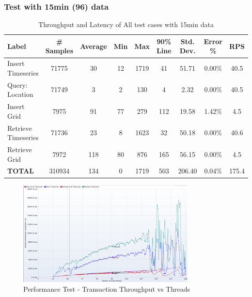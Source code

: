\subsubsection{Test with 15min (96) data}
\begin{table}[]
\begin{tabulary}{\linewidth}{|L|C|C|C|C|C|C|C|C|}
\hline
Label & \# Samples & Average & Min & Max & 90\% Line & Std. Dev. & Error \% & RPS \\ \hline
Insert Timeseries & 71775 & 30 & 12 & 1719 & 41 & 51.71 & 0.00\% & 40.5 \\ \hline
Query: Location & 71749 & 3 & 2 & 130 & 4 & 2.32 & 0.00\% & 40.5 \\ \hline
Insert Grid & 7975 & 91 & 77 & 279 & 112 & 19.58 & 1.42\% & 4.5 \\ \hline
Retrieve Timeseries & 71736 & 23 & 8 & 1623 & 32 & 50.18 & 0.00\% & 40.6 \\ \hline
Retrieve Grid & 7972 & 118 & 80 & 876 & 165 & 56.15 & 0.00\% & 4.5 \\ \hline
\textbf{TOTAL} & 310934 & 134 & 0 & 1719 & 503 & 206.40 & 0.04\% & 175.4 \\ \hline
\end{tabulary}
\caption{Throughput and Latency of All test cases with 15min data}
\label{tab:obs_all_15_min_summary}
\end{table}

\begin{figure}[htp]
    \centering
    \includegraphics[width=0.8\textwidth]{results/obs/all/obs_all_15m_transaction_throughtput_vs_threads.png}
    \caption{Performance Test - Transaction Throughput vs Threads}
    \label{fi:test_obs_all_15m_throughtput}
\end{figure}

